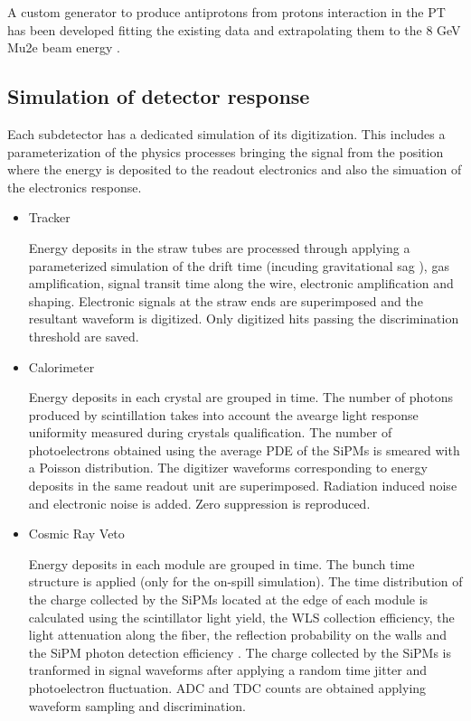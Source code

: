 A custom generator to produce antiprotons from protons interaction in the PT has been developed fitting the existing data and extrapolating them to the 8 GeV Mu2e beam energy \cite{SU2020:2023}.


\subsection{ Simulation of detector response}
Each subdetector has a dedicated simulation of its digitization. This includes a parameterization of the physics processes bringing the signal from the position where the energy is deposited to the readout electronics and also the simuation of the electronics response. 
\begin{itemize}
\item{Tracker}

Energy deposits in the straw tubes are processed through applying a parameterized simulation of the drift time (incuding gravitational sag ), gas amplification, signal transit time along the wire, electronic amplification and shaping. Electronic signals at the straw ends are superimposed and the resultant waveform is digitized. Only digitized hits passing the discrimination threshold are saved.
\item{Calorimeter}

  Energy deposits in each crystal are grouped in time. The number of photons produced by scintillation takes into account the avearge light response uniformity measured during crystals qualification. The number of photoelectrons obtained using the average PDE of the SiPMs is smeared with a Poisson distribution. The digitizer waveforms corresponding to energy deposits in the same readout unit are superimposed. Radiation induced noise and electronic noise is added. Zero suppression is reproduced.
\item{Cosmic Ray Veto}

Energy deposits in each module are grouped in time. The bunch time structure is applied (only for the on-spill simulation). The time distribution of the charge collected by the SiPMs located at the edge of each module is calculated using the scintillator light yield, the WLS collection efficiency, the light attenuation along the fiber, the reflection probability on the walls and the SiPM photon detection efficiency . The charge collected by the SiPMs is tranformed in signal waveforms after applying a random time jitter and photoelectron fluctuation. ADC and TDC counts are obtained applying waveform sampling and discrimination. 


\end{itemize}
